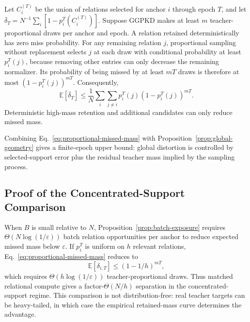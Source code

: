 Let $C_i^{(T)}$ be the union of relations selected for anchor $i$ through epoch $T$, and let $\bar\delta_T=N^{-1}\sum_i[1-p_i^T(C_i^{(T)})]$. Suppose GGPKD makes at least $m$ teacher-proportional draws per anchor and epoch. A relation retained deterministically has zero miss probability. For any remaining relation $j$, proportional sampling without replacement selects $j$ at each draw with conditional probability at least $p_i^T(j)$, because removing other entries can only decrease the remaining normalizer. Its probability of being missed by at least $mT$ draws is therefore at most $(1-p_i^T(j))^{mT}$. Consequently,
\begin{equation}
\mathbb E[\bar\delta_T]
\leq\frac1N\sum_i\sum_{j\neq i}
p_i^T(j)(1-p_i^T(j))^{mT}.
\label{eq:proportional-missed-mass}
\end{equation}
Deterministic high-mass retention and additional candidates can only reduce missed mass.

Combining Eq.~\eqref{eq:proportional-missed-mass} with Proposition~\ref{prop:global-geometry} gives a finite-epoch upper bound: global distortion is controlled by selected-support error plus the residual teacher mass implied by the sampling process.

\subsection{Proof of the Concentrated-Support Comparison}
\label{app:concentrated-support}

When $B$ is small relative to $N$, Proposition~\ref{prop:batch-exposure} requires $\Theta(N\log(1/\varepsilon))$ batch relation opportunities per anchor to reduce expected missed mass below $\varepsilon$. If $p_i^T$ is uniform on $h$ relevant relations, Eq.~\eqref{eq:proportional-missed-mass} reduces to
\begin{equation}
\mathbb E[\delta_{i,T}]
\leq (1-1/h)^{mT},
\end{equation}
which requires $\Theta(h\log(1/\varepsilon))$ teacher-proportional draws. Thus matched relational compute gives a factor-$\Theta(N/h)$ separation in the concentrated-support regime. This comparison is not distribution-free: real teacher targets can be heavy-tailed, in which case the empirical retained-mass curve determines the advantage.

